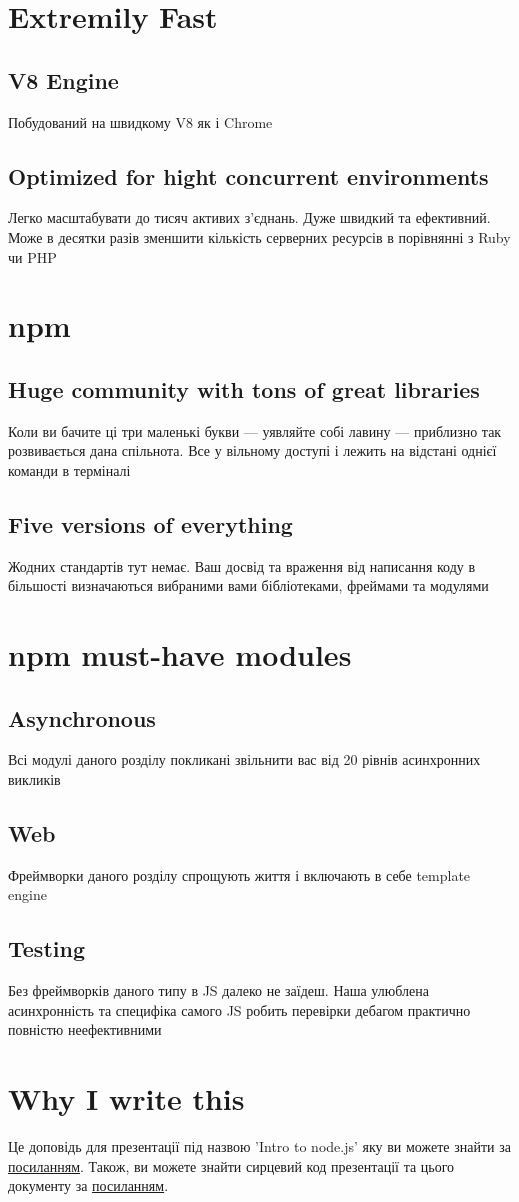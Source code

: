 \documentclass{article}
\begin{document}
  \section{Extremily Fast}
    \subsection{V8 Engine}
      Побудований на швидкому V8 як і Chrome
    \subsection{Optimized for hight concurrent environments}
      Легко масштабувати до тисяч активих з’єднань. Дуже швидкий та ефективний. Може
      в десятки разів зменшити кількість серверних ресурсів в порівнянні з Ruby чи PHP
  \section{npm}
    \subsection{Huge community with tons of great libraries}
      Коли ви бачите ці три маленькі букви --- уявляйте собі лавину --- приблизно
      так розвивається дана спільнота. Все у вільному доступі і лежить на відстані
      однієї команди в терміналі
    \subsection{Five versions of everything}
      Жодних стандартів тут немає. Ваш досвід та враження від написання коду в
      більшості визначаються вибраними вами бібліотеками, фреймами та модулями
  \section{npm must-have modules}
    \subsection{Asynchronous}
      Всі модулі даного розділу покликані звільнити вас від 20 рівнів асинхронних викликів
    \subsection{Web}
      Фреймворки даного розділу спрощують життя і включають в себе template engine
    \subsection{Testing}
      Без фреймворків даного типу в JS далеко не заїдеш. Наша улюблена асинхронність
      та специфіка самого JS робить перевірки дебагом практично повністю неефективними
  \section{Why I write this}
      Це доповідь для презентації під назвою 'Intro to node.js' яку ви можете
      знайти за \href{http://valkovolodya.github.io/nodejs-slides/}{посиланням}.
      Також, ви можете знайти сирцевий код презентації та цього документу за
      \href{https://github.com/ValkoVolodya/nodejs-slides}{посиланням}.
\end{document}
